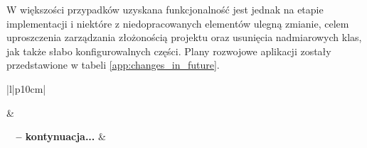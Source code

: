 W większości przypadków uzyskana funkcjonalność jest jednak na etapie implementacji i niektóre z niedopracowanych elementów 
ulegną zmianie, celem uproszczenia zarządzania złożonością projektu oraz usunięcia nadmiarowych klas, jak także słabo konfigurowalnych części.
Plany rozwojowe aplikacji zostały przedstawione w tabeli \ref{app:changes_in_future}.
\begin{center}
	\begin{longtable}{|l|p{10cm}|}
		\caption[Plany rozwojowe aplikacji demonstracyjnej]{
			Plany rozwojowe aplikacji demonstracyjnej
		}
		\label{app:changes_in_future}
		\tabularnewline	
		
		\hline
					&
				\tabularnewline
		\hline
		\endfirsthead
		
		{{\bfseries \tablename\ \thetable{} -- kontynuacja...}} \tabularnewline
		\hline
					&
				\tabularnewline
		\hline
		\endhead
			
		\hline
			 \tabularnewline \hline
		\endfoot
		\hline
		\endlastfoot	
		

\end{longtable}
\end{center}
